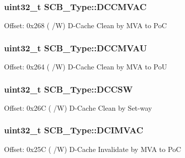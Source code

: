 \subsubsection[{\texorpdfstring{D\+C\+C\+M\+V\+AC}{DCCMVAC}}]{ uint32\+\_\+t S\+C\+B\+\_\+\+Type\+::\+D\+C\+C\+M\+V\+AC}\hypertarget{structSCB__Type_a6887612a34a60a320a299dfe3d50cbf7}{}\label{structSCB__Type_a6887612a34a60a320a299dfe3d50cbf7}
Offset\+: 0x268 ( /W) D-\/\+Cache Clean by M\+VA to PoC 
\subsubsection[{\texorpdfstring{D\+C\+C\+M\+V\+AU}{DCCMVAU}}]{ uint32\+\_\+t S\+C\+B\+\_\+\+Type\+::\+D\+C\+C\+M\+V\+AU}\hypertarget{structSCB__Type_a37356bd9475a8be5a1e9f1489297e5dd}{}\label{structSCB__Type_a37356bd9475a8be5a1e9f1489297e5dd}
Offset\+: 0x264 ( /W) D-\/\+Cache Clean by M\+VA to PoU 
\subsubsection[{\texorpdfstring{D\+C\+C\+SW}{DCCSW}}]{ uint32\+\_\+t S\+C\+B\+\_\+\+Type\+::\+D\+C\+C\+SW}\hypertarget{structSCB__Type_a49dfb8c504b1aced86af1c5eff699755}{}\label{structSCB__Type_a49dfb8c504b1aced86af1c5eff699755}
Offset\+: 0x26C ( /W) D-\/\+Cache Clean by Set-\/way 
\subsubsection[{\texorpdfstring{D\+C\+I\+M\+V\+AC}{DCIMVAC}}]{ uint32\+\_\+t S\+C\+B\+\_\+\+Type\+::\+D\+C\+I\+M\+V\+AC}\hypertarget{structSCB__Type_a2498dd236ec61bc0983f851ec2d1dadc}{}\label{structSCB__Type_a2498dd236ec61bc0983f851ec2d1dadc}
Offset\+: 0x25C ( /W) D-\/\+Cache Invalidate by M\+VA to PoC 
